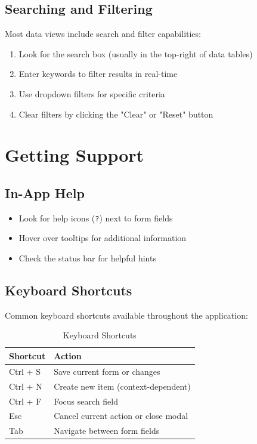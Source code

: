 \subsection{Searching and Filtering}

Most data views include search and filter capabilities:

\begin{enumerate}
    \item Look for the search box (usually in the top-right of data tables)
    \item Enter keywords to filter results in real-time
    \item Use dropdown filters for specific criteria
    \item Clear filters by clicking the "Clear" or "Reset" button
\end{enumerate}

\section{Getting Support}

\subsection{In-App Help}

\begin{itemize}
    \item Look for help icons (\texttt{?}) next to form fields
    \item Hover over tooltips for additional information
    \item Check the status bar for helpful hints
\end{itemize}

\subsection{Keyboard Shortcuts}

Common keyboard shortcuts available throughout the application:

\begin{table}[H]
\centering
\begin{tabular}{@{}ll@{}}
\toprule
\textbf{Shortcut} & \textbf{Action} \\
\midrule
Ctrl + S & Save current form or changes \\
Ctrl + N & Create new item (context-dependent) \\
Ctrl + F & Focus search field \\
Esc & Cancel current action or close modal \\
Tab & Navigate between form fields \\
\bottomrule
\end{tabular}
\caption{Keyboard Shortcuts}
\label{tab:keyboard_shortcuts}
\end{table}

